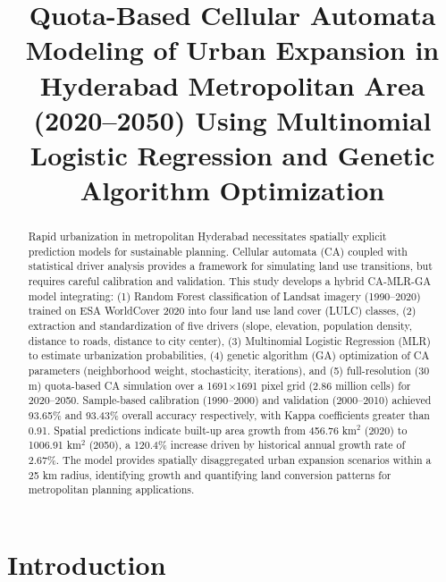 \documentclass[conference]{IEEEtran}
\begin{document}
\title{Quota-Based Cellular Automata Modeling of Urban Expansion in Hyderabad Metropolitan Area (2020--2050) Using Multinomial Logistic Regression and Genetic Algorithm Optimization}

\author{
\and
{}
\and
{}
\and
{}
}

\maketitle

\begin{abstract}
Rapid urbanization in metropolitan Hyderabad necessitates spatially explicit prediction models for sustainable planning. Cellular automata (CA) coupled with statistical driver analysis provides a framework for simulating land use transitions, but requires careful calibration and validation. This study develops a hybrid CA-MLR-GA model integrating: (1) Random Forest classification of Landsat imagery (1990--2020) trained on ESA WorldCover 2020 into four land use land cover (LULC) classes, (2) extraction and standardization of five drivers (slope, elevation, population density, distance to roads, distance to city center), (3) Multinomial Logistic Regression (MLR) to estimate urbanization probabilities, (4) genetic algorithm (GA) optimization of CA parameters (neighborhood weight, stochasticity, iterations), and (5) full-resolution (30 m) quota-based CA simulation over a 1691$\times$1691 pixel grid (2.86 million cells) for 2020--2050. Sample-based calibration (1990--2000) and validation (2000--2010) achieved 93.65\% and 93.43\% overall accuracy respectively, with Kappa coefficients greater than 0.91. Spatial predictions indicate built-up area growth from 456.76 km$^2$ (2020) to 1006.91 km$^2$ (2050), a 120.4\% increase driven by historical annual growth rate of 2.67\%. The model provides spatially disaggregated urban expansion scenarios within a 25 km radius, identifying growth and quantifying land conversion patterns for metropolitan planning applications.
\end{abstract}


\section{Introduction}
\end{document}
